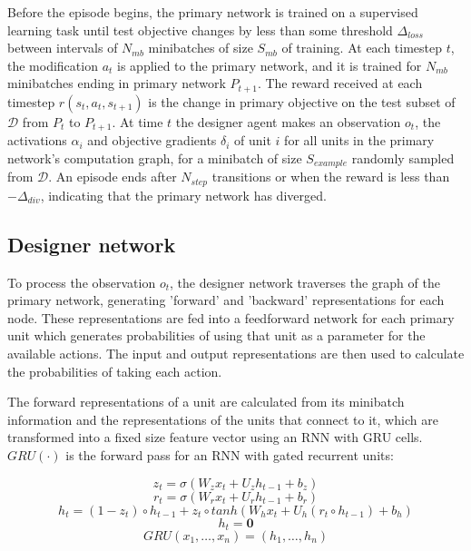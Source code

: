 \documentclass{article}[12px]
\begin{document}
Before the episode begins, the primary network is trained on a supervised learning task until test objective changes by less than some threshold \(\Delta_{loss}\) between intervals of \(N_{mb}\) minibatches of size \(S_{mb}\) of training. At each timestep \(t\), the modification \(a_t\) is applied to the primary network, and it is trained for \(N_{mb}\) minibatches ending in primary network \(P_{t+1}\). The reward received at each timestep \(r(s_t, a_t, s_{t+1})\) is the change in primary objective on the test subset of \(\mathcal{D}\) from \(P_t\) to \(P_{t+1}\). At time \(t\) the designer agent makes an observation \(o_t\), the activations \(\alpha_i\) and objective gradients \(\delta_i\) of unit \(i\) for all units in the primary network's computation graph, for a minibatch of size \(S_{example}\) randomly sampled from \(\mathcal{D}\). An episode ends after \(N_{step}\) transitions or when the reward is less than \(-\Delta_{div}\), indicating that the primary network has diverged.

\subsection{Designer network}

To process the observation \(o_t\), the designer network traverses the graph of the primary network, generating 'forward' and 'backward' representations for each node. These representations are fed into a feedforward network for each primary unit which generates probabilities of using that unit as a parameter for the available actions. The input and output representations are then used to calculate the probabilities of taking each action.

The forward representations of a unit are calculated from its minibatch information and the representations of the units that connect to it, which are transformed into a fixed size feature vector using an RNN with GRU cells. \(GRU(\cdot)\) is the forward pass for an RNN with gated recurrent units:

\begin{equation}
  z_t = \sigma(W_zx_t + U_zh_{t-1} + b_z)
\end{equation}
\begin{equation}
  r_t = \sigma(W_rx_t + U_rh_{t-1} + b_r)
\end{equation}
\begin{equation}
  h_t = (1-z_t) \circ h_{t-1} + z_t \circ tanh(W_hx_t + U_h(r_t \circ h_{t-1}) + b_h)
\end{equation}
\begin{equation}
  h_t = \mathbf{0}
\end{equation}
\begin{equation}
  GRU(x_1, \ldots, x_n) = (h_1, \ldots, h_n)
\end{equation}
\end{document}
